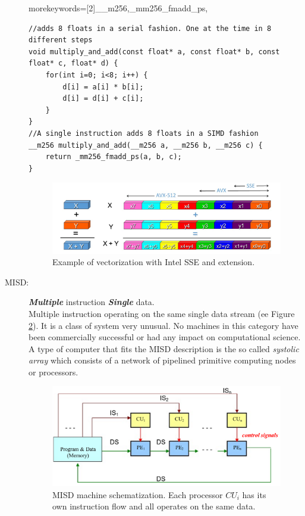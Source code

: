 \begin{description}
{	morekeywords=[2]{__m256,_mm256_fmadd_ps},
}
\begin{lstlisting}
//adds 8 floats in a serial fashion. One at the time in 8 different steps
void multiply_and_add(const float* a, const float* b, const float* c, float* d) {  
	for(int i=0; i<8; i++) {
		d[i] = a[i] * b[i];
		d[i] = d[i] + c[i];
	}
}
//A single instruction adds 8 floats in a SIMD fashion
__m256 multiply_and_add(__m256 a, __m256 b, __m256 c) {
	return _mm256_fmadd_ps(a, b, c);
}
\end{lstlisting}
\begin{figure}[!htbp]
	\centering
	\includegraphics[width=1.0\textwidth]{./images/parallel_programming/vectorization_example}
	\caption{Example of vectorization with Intel SSE and extension.}
	\label{fig:SSEvectorization}
\end{figure}

\item[MISD:] \textit{\textbf{Multiple}} instruction \textit{\textbf{Single}} data. \hfill \\ 
Multiple instruction operating on the same single data stream  (ee Figure \ref{fig:MISD}). It is a class of system very unusual. No machines in this category have been commercially successful or had any impact on computational science. 
A type of computer  that fits the MISD description is the so called \textit{systolic array} \cite{fortes:1987,kung:1984} which consists of a network of pipelined primitive computing nodes or processors. 
\begin{figure}[!htbp]
	\centering
	\includegraphics[width=1.0\textwidth]{./images/parallel_programming/MISD}
	\caption{MISD machine schematization. Each processor $CU_i$ has its own instruction flow and all operates on the same data.}
	\label{fig:MISD}
\end{figure}
 

\end{description}
